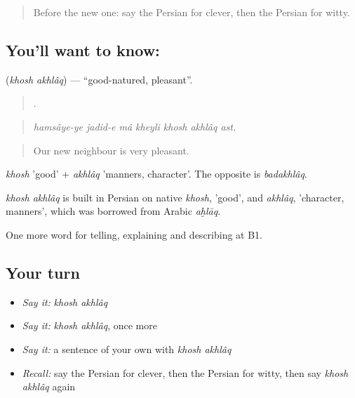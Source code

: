 \label{lesson:FA-C488-khosh-akhlaq}



\begin{quote}
Before the new one: say the Persian for clever, then the Persian for witty.
\end{quote}

\subsection*{You'll want to know:  }
\textbf{ } (\emph{khosh akhlâq}) — \textquotedblleft{}good-natured, pleasant\textquotedblright{}.

\begin{quote}
      .
\end{quote}

\begin{quote}
\emph{hamsâye-ye jadid-e mâ kheyli khosh akhlâq ast.}
\end{quote}

\begin{quote}
Our new neighbour is very pleasant.
\end{quote}

\emph{khosh} 'good' + \emph{akhlâq} 'manners, character'. The opposite is \emph{badakhlâq}.

\begin{cousinweb}
\emph{khosh akhlâq} is built in Persian on native \emph{khosh}, 'good', and \emph{akhlâq}, 'character, manners', which was borrowed from Arabic \emph{aḫlāq}.
\end{cousinweb}

\begin{grammarlens}[title={What you've built}]
One more word for telling, explaining and describing at B1.
\end{grammarlens}

\subsection*{Your turn}
\begin{itemize}
\raggedright
  \item \emph{Say it:} \emph{khosh akhlâq}
  \item \emph{Say it:} \emph{khosh akhlâq}, once more
  \item \emph{Say it:} a sentence of your own with \emph{khosh akhlâq}
  \item \emph{Recall:} say the Persian for clever, then the Persian for witty, then say \emph{khosh akhlâq} again
\end{itemize}

